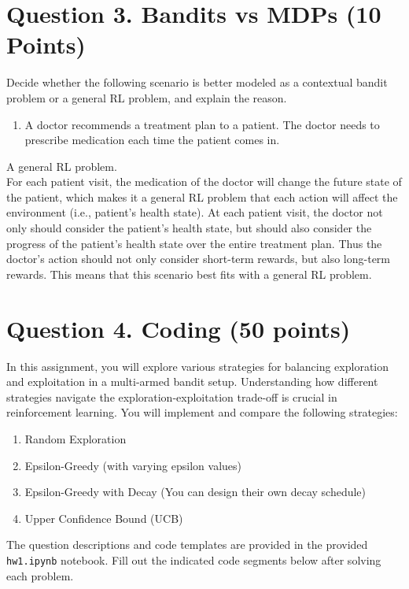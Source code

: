 \documentclass[12pt]{article}
\begin{document}
\section*{Question 3. Bandits vs MDPs (10 Points)}
 Decide whether the following scenario is better modeled as a contextual bandit problem or a general RL problem, and explain the reason.
                \begin{enumerate}

                    \item A doctor recommends a treatment plan to a patient. The doctor needs to prescribe medication each time the patient comes in.
                \end{enumerate}

\begin{solution}
    A general RL problem. \\
    For each patient visit, the medication of the doctor will change the future state of the patient, which makes it a general RL problem that each action will affect the environment (i.e., patient’s health state). At each patient visit, the doctor not only should consider the patient's health state, but should also consider the progress of the patient's health state over the entire treatment plan. Thus the doctor's action should not only consider short-term rewards, but also long-term rewards. This means that this scenario best fits with a general RL problem.
\end{solution}

\section*{Question 4. Coding (50 points) }
In this assignment, you will explore various strategies for balancing exploration and exploitation in a multi-armed bandit setup. Understanding how different strategies navigate the exploration-exploitation trade-off is crucial in reinforcement learning. You will implement and compare the following strategies:
\begin{enumerate}
    \item Random Exploration
    \item Epsilon-Greedy (with varying epsilon values)
    \item Epsilon-Greedy with Decay (You can design their own decay schedule)
    \item Upper Confidence Bound (UCB)
\end{enumerate}
The question descriptions and code templates are provided in the provided \texttt{hw1.ipynb} notebook. Fill out the indicated code segments below after solving 
each problem.
\end{document}

